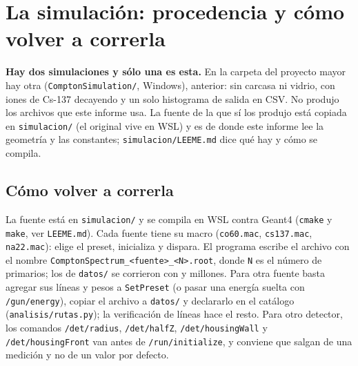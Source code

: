 \documentclass[11pt,a4paper]{article}
\begin{document}
\section{La simulación: procedencia y cómo volver a correrla}
\label{ap:simulacion}

\begin{table}[htbp]
\centering
\caption{Los dos archivos de simulación de la campaña, leídos de los propios
\texttt{.root}. El número de primarios lo escribe el programa en el nombre
del archivo a partir del \texttt{beamOn}. La fracción que deposita se compara
con la de la sección~\ref{sec:interaccion} (\ProbInteraccionCs\,\% y
\ProbInteraccionCoB\,\% por la sección eficaz total en \LadoDetector{} cm de
plástico): no tienen por qué coincidir exactamente, porque la tapa de Al
atenúa el haz y a la vez la carcasa entera dispersa fotones hacia adentro.}
\label{tab:simulacion}
{\small}
\end{table}
\begin{aviso}
\textbf{Hay dos simulaciones y sólo una es esta.} En la carpeta del proyecto
mayor hay otra (\texttt{ComptonSimulation/}, Windows), anterior: sin carcasa
ni vidrio, con iones de Cs-137 decayendo y un solo histograma de salida en
CSV. No produjo los archivos que este informe usa. La fuente de la que sí los
produjo está copiada en \texttt{simulacion/} (el original vive en WSL) y es
de donde este informe lee la geometría y las constantes; \texttt{simulacion/LEEME.md}
dice qué hay y cómo se compila.
\end{aviso}

\subsection{Cómo volver a correrla}

La fuente está en \texttt{simulacion/} y se compila en WSL contra Geant4
\SimVersion{} (\texttt{cmake} y \texttt{make}, ver \texttt{LEEME.md}). Cada
fuente tiene su macro (\texttt{co60.mac}, \texttt{cs137.mac},
\texttt{na22.mac}): elige el preset, inicializa y dispara. El programa
escribe el archivo con el nombre \texttt{ComptonSpectrum\_<fuente>\_<N>.root},
donde \texttt{N} es el número de primarios; los de \texttt{datos/} se corrieron
con \SimPrimariosCo{} y \SimPrimariosCs{} millones. Para otra fuente basta
agregar sus líneas y pesos a \texttt{SetPreset} (o pasar una energía suelta
con \texttt{/gun/energy}), copiar el archivo a \texttt{datos/} y declararlo
en el catálogo (\texttt{analisis/rutas.py}); la verificación de líneas hace el
resto. Para otro detector, los comandos \texttt{/det/radius},
\texttt{/det/halfZ}, \texttt{/det/housingWall} y \texttt{/det/housingFront}
van antes de \texttt{/run/initialize}, y conviene que salgan de una medición
y no de un valor por defecto.
\end{document}
